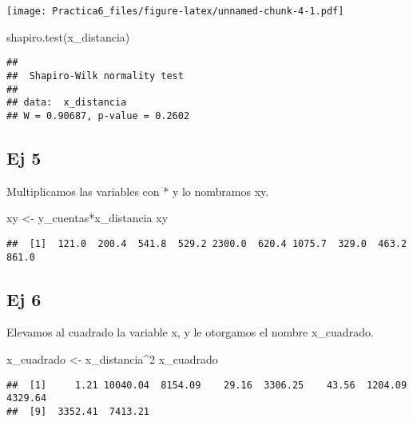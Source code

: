\documentclass[
]{article}
\newenvironment{Shaded}{\begin{snugshade}}{\end{snugshade}}
\newcommand{\DecValTok}[1]{\textcolor[rgb]{0.00,0.00,0.81}{#1}}
\newcommand{\FunctionTok}[1]{\textcolor[rgb]{0.00,0.00,0.00}{#1}}
\newcommand{\NormalTok}[1]{#1}
\newcommand{\OtherTok}[1]{\textcolor[rgb]{0.56,0.35,0.01}{#1}}
\newcommand{\SpecialCharTok}[1]{\textcolor[rgb]{0.00,0.00,0.00}{#1}}
\begin{document}
\texttt{[image: Practica6\_files/figure-latex/unnamed-chunk-4-1.pdf]}

\begin{Shaded}
\begin{Highlighting}[]
\FunctionTok{shapiro.test}\NormalTok{(x\_distancia)}
\end{Highlighting}
\end{Shaded}

\begin{verbatim}
## 
##  Shapiro-Wilk normality test
## 
## data:  x_distancia
## W = 0.90687, p-value = 0.2602
\end{verbatim}

\hypertarget{ej-5}{%
\subsection{Ej 5}\label{ej-5}}

Multiplicamos las variables con * y lo nombramos xy.

\begin{Shaded}
\begin{Highlighting}[]
\NormalTok{xy }\OtherTok{\textless{}{-}}\NormalTok{ y\_cuentas}\SpecialCharTok{*}\NormalTok{x\_distancia}
\NormalTok{xy}
\end{Highlighting}
\end{Shaded}

\begin{verbatim}
##  [1]  121.0  200.4  541.8  529.2 2300.0  620.4 1075.7  329.0  463.2  861.0
\end{verbatim}

\hypertarget{ej-6}{%
\subsection{Ej 6}\label{ej-6}}

Elevamos al cuadrado la variable x, y le otorgamos el nombre
x\_cuadrado.

\begin{Shaded}
\begin{Highlighting}[]
\NormalTok{x\_cuadrado }\OtherTok{\textless{}{-}}\NormalTok{ x\_distancia}\SpecialCharTok{\^{}}\DecValTok{2}
\NormalTok{x\_cuadrado}
\end{Highlighting}
\end{Shaded}

\begin{verbatim}
##  [1]     1.21 10040.04  8154.09    29.16  3306.25    43.56  1204.09  4329.64
##  [9]  3352.41  7413.21
\end{verbatim}
\end{document}
